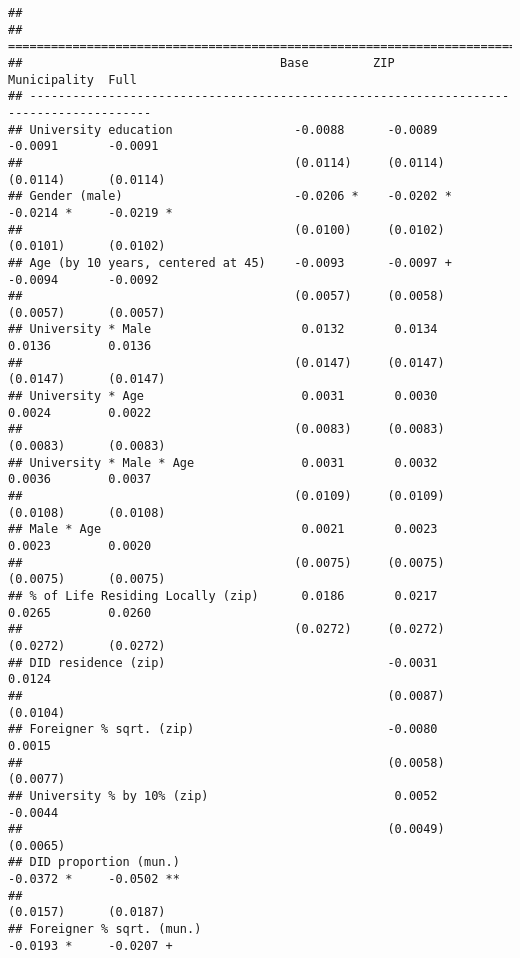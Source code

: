 \documentclass[
]{article}
\begin{document}
\begin{verbatim}
## 
## =======================================================================================
##                                    Base         ZIP          Municipality  Full        
## ---------------------------------------------------------------------------------------
## University education                 -0.0088      -0.0089      -0.0091       -0.0091   
##                                      (0.0114)     (0.0114)     (0.0114)      (0.0114)  
## Gender (male)                        -0.0206 *    -0.0202 *    -0.0214 *     -0.0219 * 
##                                      (0.0100)     (0.0102)     (0.0101)      (0.0102)  
## Age (by 10 years, centered at 45)    -0.0093      -0.0097 +    -0.0094       -0.0092   
##                                      (0.0057)     (0.0058)     (0.0057)      (0.0057)  
## University * Male                     0.0132       0.0134       0.0136        0.0136   
##                                      (0.0147)     (0.0147)     (0.0147)      (0.0147)  
## University * Age                      0.0031       0.0030       0.0024        0.0022   
##                                      (0.0083)     (0.0083)     (0.0083)      (0.0083)  
## University * Male * Age               0.0031       0.0032       0.0036        0.0037   
##                                      (0.0109)     (0.0109)     (0.0108)      (0.0108)  
## Male * Age                            0.0021       0.0023       0.0023        0.0020   
##                                      (0.0075)     (0.0075)     (0.0075)      (0.0075)  
## % of Life Residing Locally (zip)      0.0186       0.0217       0.0265        0.0260   
##                                      (0.0272)     (0.0272)     (0.0272)      (0.0272)  
## DID residence (zip)                               -0.0031                     0.0124   
##                                                   (0.0087)                   (0.0104)  
## Foreigner % sqrt. (zip)                           -0.0080                     0.0015   
##                                                   (0.0058)                   (0.0077)  
## University % by 10% (zip)                          0.0052                    -0.0044   
##                                                   (0.0049)                   (0.0065)  
## DID proportion (mun.)                                          -0.0372 *     -0.0502 **
##                                                                (0.0157)      (0.0187)  
## Foreigner % sqrt. (mun.)                                       -0.0193 *     -0.0207 + 

\end{verbatim}
\end{document}
